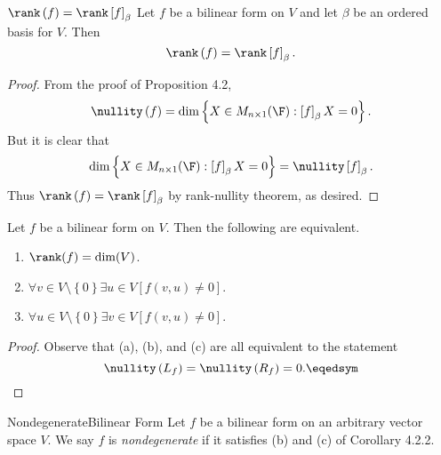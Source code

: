 \documentclass[math_245.tex]{subfiles}
\begin{document}
    \begin{cor}{$\rank\left( f \right) =\rank\left[ f \right] _\beta$}
        Let $f$ be a bilinear form on $V$ and let $\beta$ be an ordered basis for $V$. Then
        \begin{equation*}
            \rank\left( f \right) = \rank\left[ f \right] _\beta.
        \end{equation*}
    \end{cor}	

    \begin{proof}
        From the proof of Proposition 4.2,
        \begin{equation*}
            \nullity\left( f \right) = \dim\left\lbrace X\in M_{n\times 1}(\F) : \left[ f \right] _\beta X = 0 \right\rbrace .
        \end{equation*}
        But it is clear that
        \begin{equation*}
            \dim\left\lbrace X\in M_{n\times 1}(\F) : \left[ f \right] _\beta X = 0 \right\rbrace = \nullity\left[ f \right] _\beta.
        \end{equation*}
        Thus $\rank\left( f \right) = \rank\left[ f \right] _\beta$ by rank-nullity theorem, as desired.
    \end{proof}

    \clearpage
    \begin{cor}{}
        Let $f$ be a bilinear form on $V$. Then the following are equivalent.
        \begin{enumerate}
            \item $\rank(f) = \dim(V)$.
            \item $\forall v\in V\setminus \left\lbrace 0 \right\rbrace\exists u\in V \left[ f\left( v,u \right) \neq 0 \right]$.
            \item $\forall u\in V\setminus \left\lbrace 0 \right\rbrace\exists v\in V \left[ f\left( v,u \right) \neq 0 \right]$.
        \end{enumerate}
    \end{cor}	

    \begin{proof}
        Observe that (a), (b), and (c) are all equivalent to the statement
        \begin{equation*}
            \nullity\left( L_f \right) = \nullity\left( R_f \right) = 0. \eqedsym
        \end{equation*}
    \end{proof}

    \begin{definition}{Nondegenerate}{Bilinear Form}
        Let $f$ be a bilinear form on an arbitrary vector space $V$. We say $f$ is \emph{nondegenerate} if it satisfies (b) and (c) of Corollary 4.2.2.
    \end{definition}
\end{document}

